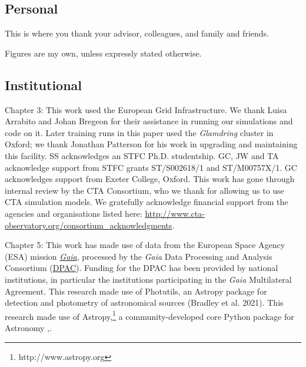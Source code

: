 \subsection*{Personal}

This is where you thank your advisor, colleagues, and family and friends.

Figures are my own, unless expressly stated otherwise. 


\subsection*{Institutional}

Chapter 3: This work used the European Grid Infrastructure. We thank Luisa Arrabito and Johan Bregeon for their assistance in running our simulations and code on it. Later training runs in this paper used the \textit{Glamdring} cluster in Oxford; we thank Jonathan Patterson for his work in upgrading and maintaining this facility. SS acknowledges an STFC Ph.D. studentship. GC, JW and TA acknowledge support from STFC grants ST/S002618/1 and ST/M00757X/1. GC acknowledges support from Exeter College, Oxford. This work has gone through internal review by the CTA Consortium, who we thank for allowing us to use CTA simulation models. We gratefully acknowledge financial support from the agencies and organisations listed here: \url{http://www.cta-observatory.org/consortium\_acknowledgments}.

Chapter 5:
This work has made use of data from the European Space Agency (ESA) mission \href{https://www.cosmos.esa.int/gaia}{\textit{Gaia}}, processed by the \textit{Gaia} Data Processing and Analysis Consortium (\href{https://www.cosmos.esa.int/web/gaia/dpac/consortium}{DPAC}). Funding for the DPAC has been provided by national institutions, in particular the institutions participating in the \textit{Gaia} Multilateral Agreement. This research made use of Photutils, an Astropy package for detection and photometry of astronomical sources (Bradley et al.
2021). This research made use of Astropy,\footnote{http://www.astropy.org} a community-developed core Python package for Astronomy \cite{astropy:2013},\cite{astropy:2018}.

